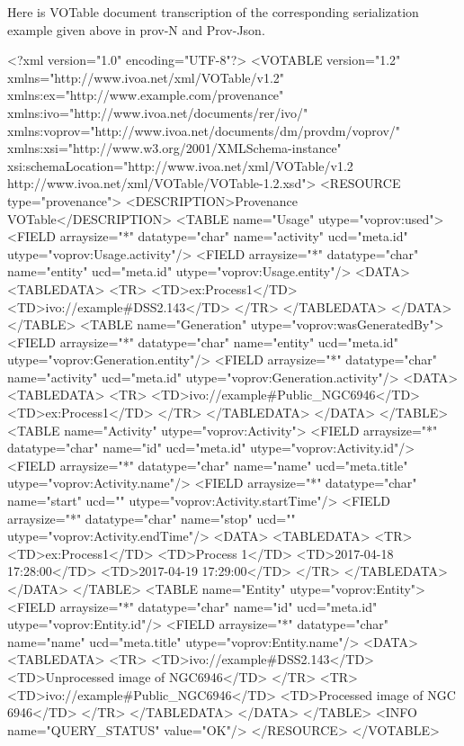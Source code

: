 Here is VOTable document transcription of the corresponding serialization example given above in prov-N and Prov-Json.

\begin{verbnobox}[\scriptsize]
<?xml version="1.0" encoding="UTF-8"?>
<VOTABLE version="1.2" xmlns="http://www.ivoa.net/xml/VOTable/v1.2" xmlns:ex="http://www.example.com/provenance" xmlns:ivo="http://www.ivoa.net/documents/rer/ivo/" xmlns:voprov="http://www.ivoa.net/documents/dm/provdm/voprov/" xmlns:xsi="http://www.w3.org/2001/XMLSchema-instance" xsi:schemaLocation="http://www.ivoa.net/xml/VOTable/v1.2 http://www.ivoa.net/xml/VOTable/VOTable-1.2.xsd">
  <RESOURCE type="provenance">
    <DESCRIPTION>Provenance VOTable</DESCRIPTION>
    <TABLE name="Usage" utype="voprov:used">
      <FIELD arraysize="*" datatype="char" name="activity" ucd="meta.id" utype="voprov:Usage.activity"/>
      <FIELD arraysize="*" datatype="char" name="entity" ucd="meta.id" utype="voprov:Usage.entity"/>
      <DATA>
        <TABLEDATA>
          <TR>
            <TD>ex:Process1</TD>
            <TD>ivo://example#DSS2.143</TD>
          </TR>
        </TABLEDATA>
      </DATA>
    </TABLE>
    <TABLE name="Generation" utype="voprov:wasGeneratedBy">
      <FIELD arraysize="*" datatype="char" name="entity" ucd="meta.id" utype="voprov:Generation.entity"/>
      <FIELD arraysize="*" datatype="char" name="activity" ucd="meta.id" utype="voprov:Generation.activity"/>
      <DATA>
        <TABLEDATA>
          <TR>
            <TD>ivo://example#Public_NGC6946</TD>
            <TD>ex:Process1</TD>
          </TR>
        </TABLEDATA>
      </DATA>
    </TABLE>
    <TABLE name="Activity" utype="voprov:Activity">
      <FIELD arraysize="*" datatype="char" name="id" ucd="meta.id" utype="voprov:Activity.id"/>
      <FIELD arraysize="*" datatype="char" name="name" ucd="meta.title" utype="voprov:Activity.name"/>
      <FIELD arraysize="*" datatype="char" name="start" ucd="" utype="voprov:Activity.startTime"/>
      <FIELD arraysize="*" datatype="char" name="stop" ucd="" utype="voprov:Activity.endTime"/>
      <DATA>
        <TABLEDATA>
          <TR>
            <TD>ex:Process1</TD>
            <TD>Process 1</TD>
            <TD>2017-04-18 17:28:00</TD>
            <TD>2017-04-19 17:29:00</TD>
          </TR>
        </TABLEDATA>
      </DATA>
    </TABLE>
    <TABLE name="Entity" utype="voprov:Entity">
      <FIELD arraysize="*" datatype="char" name="id" ucd="meta.id" utype="voprov:Entity.id"/>
      <FIELD arraysize="*" datatype="char" name="name" ucd="meta.title" utype="voprov:Entity.name"/>
      <DATA>
        <TABLEDATA>
          <TR>
            <TD>ivo://example#DSS2.143</TD>
            <TD>Unprocessed image of NGC6946</TD>
          </TR>
          <TR>
            <TD>ivo://example#Public_NGC6946</TD>
            <TD>Processed image of NGC 6946</TD>
          </TR>
        </TABLEDATA>
      </DATA>
    </TABLE>
    <INFO name="QUERY_STATUS" value="OK"/>
  </RESOURCE>
</VOTABLE>

\end{verbnobox}

